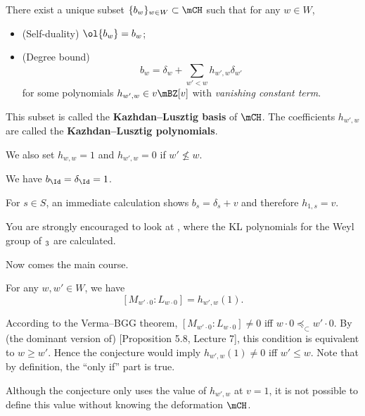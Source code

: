 \begin{thmdefn}
	There exist a unique subset $\{ b_w \}_{w\in W} \subset \mCH$ such that for any $w\in W$,
	\begin{itemize}
		\item
			(Self-duality) $\ol{b_w} = b_w$;
		\item
			(Degree bound) 
			\[
				b_w = \delta_w + \sum_{w'<w} h_{w',w} \delta_{w'}
			\]
			for some polynomials $h_{w',w} \in v\mBZ[v]$ with \emph{vanishing constant term}.
	\end{itemize}
	This subset is called the \textbf{Kazhdan--Lusztig basis} of $\mCH$. The coefficients $h_{w',w}$ are called the \textbf{Kazhdan--Lusztig polynomials}.
\end{thmdefn}

\begin{convn}
	We also set $h_{w,w}=1$ and $h_{w',w}=0$ if $w'\nleq w$.
\end{convn}

\begin{exam}
	We have $b_{\Id} = \delta_{\Id} = 1$.
\end{exam}

\begin{exam}
	For $s\in S$, an immediate calculation shows $b_s = \delta_s +v$ and therefore $h_{1,s} = v$.
\end{exam}

\begin{rem}
	You are strongly encouraged to look at \cite[Sect. 3.3.1]{EMTW}, where the KL polynomials for the Weyl group of $\sl_3$ are calculated.
\end{rem}

	Now comes the main course.

\begin{conje}
	For any $w,w' \in W$, we have
	\[
		[M_{w'\cdot 0}: L_{w\cdot 0}] = h_{w',w}(1).
	\]
\end{conje}

\begin{rem}
	According to the Verma--BGG theorem, $[M_{w'\cdot 0}: L_{w\cdot 0}]\neq 0$ iff $w\cdot 0 \preceq_\subset w'\cdot 0$. By (the dominant version of) [Proposition 5.8, Lecture 7], this condition is equivalent to $w\ge w'$. Hence the conjecture would imply $h_{w',w}(1)\neq 0$ iff $w'\le w$. Note that by definition, the ``only if'' part is true.

\end{rem}

\begin{rem}
	Although the conjecture only uses the value of $h_{w',w}$ at $v=1$, it is not possible to define this value without knowing the deformation $\mCH$.

\end{rem}

